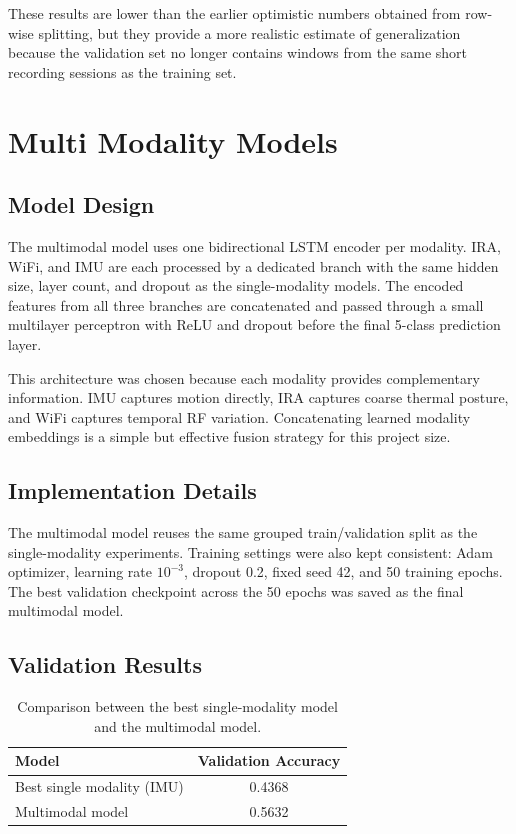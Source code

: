 These results are lower than the earlier optimistic numbers obtained from row-wise splitting, but they provide a more realistic estimate of generalization because the validation set no longer contains windows from the same short recording sessions as the training set.

\section{Multi Modality Models}
\subsection{Model Design}
The multimodal model uses one bidirectional LSTM encoder per modality. IRA, WiFi, and IMU are each processed by a dedicated branch with the same hidden size, layer count, and dropout as the single-modality models. The encoded features from all three branches are concatenated and passed through a small multilayer perceptron with ReLU and dropout before the final 5-class prediction layer.

This architecture was chosen because each modality provides complementary information. IMU captures motion directly, IRA captures coarse thermal posture, and WiFi captures temporal RF variation. Concatenating learned modality embeddings is a simple but effective fusion strategy for this project size.

\subsection{Implementation Details}
The multimodal model reuses the same grouped train/validation split as the single-modality experiments. Training settings were also kept consistent: Adam optimizer, learning rate \(10^{-3}\), dropout 0.2, fixed seed 42, and 50 training epochs. The best validation checkpoint across the 50 epochs was saved as the final multimodal model.

\subsection{Validation Results}
\begin{table}[H]
\centering
\small
\begin{tabular}{lc}
\toprule
\textbf{Model} & \textbf{Validation Accuracy} \\
\midrule
Best single modality (IMU) & 0.4368 \\
Multimodal model & 0.5632 \\
\bottomrule
\end{tabular}
\caption{Comparison between the best single-modality model and the multimodal model.}
\label{tab:multi-results}
\end{table}

